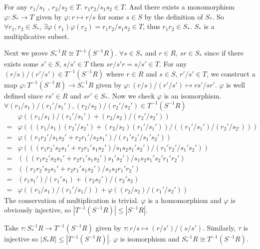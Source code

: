 \begin{answer}
    For any $r_{1} /s_{1}$ , $r_{2} /s_{2}\in T$. $r_{1}r_{2} /s_{1}s_{2}\in T$. And there exists a monomorphism $\varphi: S_{*}\to T$ given by $\varphi:r\mapsto r /s$ for some $s\in S$ by the definition of $S_{*}$. So $\forall r_{1},r_{2}\in S_{*}$, $\exists \varphi(r_{1})\varphi(r_{2})=r_{1}r_{2} /s_{1}s_{2}\in T$, thus $r_{1}r_{2}\in S_{*}$. $S_{*}$ is a multiplicative subset.

    Next we prove $S_{*}^{-1}R\cong T^{-1}(S^{-1}R)$. $\forall s\in S_{*}$ and $r\in R$, $sr\in S_{*}$ since if there exists some $s'\in S$, $s /s'\in T$ then $sr /s'r=s/s'\in T$. For any $(r /s) /(r' /s')\in T^{-1}(S^{-1}R)$ where $r\in R$ and $s\in S$, $r' /s'\in T$, we construct a map $\varphi:T^{-1}(S^{-1}R)\to S_{*}^{-1}R$ given by $\varphi :(r /s) /(r'/s')\mapsto rs'/sr'$. $\varphi$ is well defined since $rs'\in R$ and $sr'\in S_{*}$. Now we check $\varphi$ is an isomorphism. $\forall (r_{1} /s_{1}) /(r_{1}' /s_{1}'), (r_{2} /s_{2}) /(r_{2}' /s_{2}')\in T^{-1}(S^{-1}R)$
    \[\begin{aligned}
        &\varphi((r_{1} /s_{1}) /(r_{1}' /s_{1}')+(r_{2} /s_{2}) /(r_{2}' /s_{2}'))\\=&\varphi(((r_{1} /s_{1})(r_{2}'/ s_{2}')+(r_{2} /s_{2})(r_{1}'/s_{1}')) /((r_{1}'/s_{1}')/(r_{2}'/s_{2'})))\\=&\varphi((r_{1}r_{2}'/s_{1}s_{2}'+r_{2}r_{1}'/s_{2}s_{1}') /(r_{1}'r_{2}'/s_{1}'s_{2}'))\\=&\varphi(((r_{1}r_{2}'s_{2}s_{1}'+r_{2}r_{1}'s_{1}s_{2}') /s_{1}s_{2}s_{1}'s_{2}') /(r_{1}'r_{2}'/s_{1}'s_{2}'))\\=&(((r_{1}r_{2}'s_{2}s_{1}'+r_{2}r_{1}'s_{1}s_{2}')s_{1}'s_{2}') /s_{1}s_{2}s_{1}'s_{2}'r_{1}'r_{2}')\\=&((r_{1}r_{2}'s_{2}s_{1}'+r_{2}r_{1}'s_{1}s_{2}') /s_{1}s_{2}r_{1}'r_{2}')\\=&(r_{1}s_{1}') /(r_{1}'s_{1})+(r_{2}s_{2}') /(r_{2}'s_{2})\\=&\varphi((r_{1} /s_{1})/(r_{1}' /s_{1}/))+\varphi((r_{2} /s_{2}) /(r_{1}'/s_{2}'))
    \end{aligned}\]
    The conservation of multiplication is trivial. $\varphi$ is a homomorphism and $\varphi$ is obviously injective, so $\left| T^{-1}(S^{-1}R) \right|\leq \left| S^{-1}R \right| $.

    Take $\tau: S_{*}^{-1}R\to T^{-1}(S^{-1}R)$ given by $\tau:r /s\mapsto (r /s') /(s /s')$. Similarly, $\tau$ is injective so $\left| S_{*}R \right| \leq \left| T^{-1}(S^{-1}R) \right| $. $\varphi$ is isomorphism and $S_{*}^{-1}R\cong T^{-1}(S^{-1}R)$.
\end{answer}

